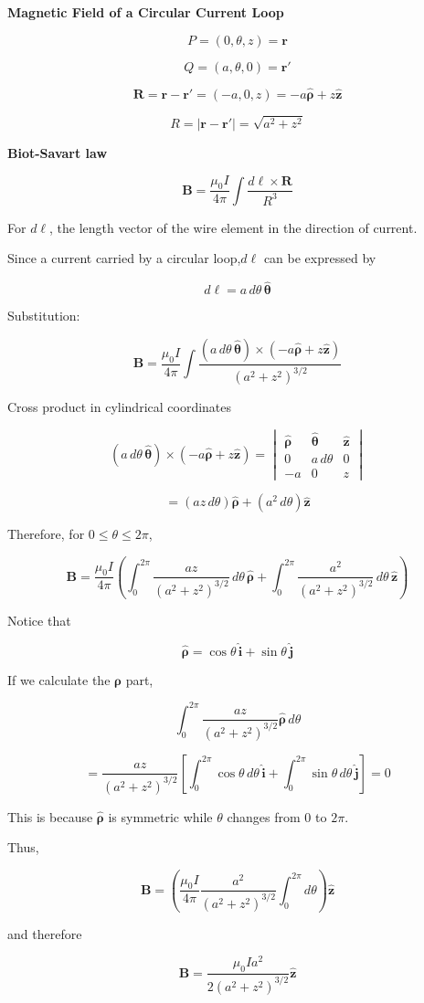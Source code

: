 \documentclass{article}
\begin{document}
{\centering \textbf{\Large Magnetic Field of a Circular Current Loop} \par}

\[
P=(0,\theta,z)=\mathbf{r}
\]

\[
Q=(a,\theta,0)=\mathbf{r}'
\]

\[
\mathbf{R}
=\mathbf{r}-\mathbf{r}'
=(-a,0,z)
=-a\hat{\boldsymbol\rho}+z\hat{\mathbf z}
\]

\[
R=|\mathbf{r}-\mathbf{r}'|
=\sqrt{a^2+z^2}
\]

\textbf{Biot-Savart law}

\[
\mathbf{B}
=
\frac{\mu_0 I}{4\pi}
\int
\frac{d\boldsymbol{\ell}\times\mathbf{R}}
{R^3}
\]

For $d\boldsymbol{\ell}$, the length vector of the wire element
in the direction of current.

Since a current carried by a circular loop,$d\boldsymbol{\ell}$ can be expressed by

\[
d\boldsymbol{\ell}
=
a\,d\theta\,\hat{\boldsymbol{\theta}}
\]

Substitution:

\[
\mathbf{B}
=
\frac{\mu_0 I}{4\pi}
\int
\frac{
(a\,d\theta\,\hat{\boldsymbol{\theta}})
\times
(-a\hat{\boldsymbol\rho}+z\hat{\mathbf z})
}
{(a^2+z^2)^{3/2}}
\]


Cross product in cylindrical coordinates

\[
(a\,d\theta\,\hat{\boldsymbol{\theta}})
\times
(-a\hat{\boldsymbol\rho}+z\hat{\mathbf z})
=
\begin{vmatrix}
\hat{\boldsymbol\rho} & \hat{\boldsymbol{\theta}} & \hat{\mathbf z}\\
0 & a\,d\theta & 0\\
-a & 0 & z
\end{vmatrix}
\]

\[
=
(az\,d\theta)\hat{\boldsymbol\rho}
+
(a^2\,d\theta)\hat{\mathbf z}
\]

Therefore, for $0\leq\theta\leq2\pi$,

\[
\mathbf{B}
=
\frac{\mu_0 I}{4\pi}
\left(
\int_0^{2\pi}
\frac{az}{(a^2+z^2)^{3/2}}
\,d\theta\,\hat{\boldsymbol\rho}
+
\int_0^{2\pi}
\frac{a^2}{(a^2+z^2)^{3/2}}
\,d\theta\,\hat{\mathbf z}
\right)
\]

Notice that

\[
\hat{\boldsymbol\rho}
=
\cos\theta\,\hat{\mathbf i}
+
\sin\theta\,\hat{\mathbf j}
\]

If we calculate the $\hat{\boldsymbol\rho}$ part,

\[
\int_0^{2\pi}
\frac{az}{(a^2+z^2)^{3/2}}
\hat{\boldsymbol\rho}\,d\theta
\]

\[
=
\frac{az}{(a^2+z^2)^{3/2}}
\left[
\int_0^{2\pi}\cos\theta\,d\theta\,\hat{\mathbf i}
+
\int_0^{2\pi}\sin\theta\,d\theta\,\hat{\mathbf j}
\right]
=0
\]

This is because $\hat{\boldsymbol\rho}$ is symmetric while $\theta$
changes from $0$ to $2\pi$.

Thus,

\[
\mathbf{B}
=
\left(
\frac{\mu_0 I}{4\pi}
\frac{a^2}{(a^2+z^2)^{3/2}}
\int_0^{2\pi}d\theta
\right)
\hat{\mathbf z}
\]

and therefore

\[
\boxed{
\mathbf{B}
=
\frac{\mu_0 I a^2}
{2(a^2+z^2)^{3/2}}
\hat{\mathbf z}
}
\]
\end{document}
